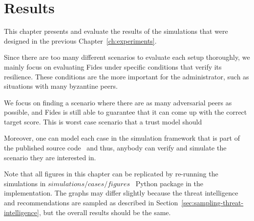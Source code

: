 \chapter{Results}
\label{ch:results}

This chapter presents and evaluate the results of the simulations that were designed in the previous Chapter~\ref{ch:experiments}. 

Since there are too many different scenarios to evaluate each setup thoroughly, we mainly focus on evaluating Fides under specific conditions that verify its resilience. These conditions are the more important for the administrator, such as situations with many byzantine peers.

We focus on finding a scenario where there are as many adversarial peers as possible, and Fides is still able to guarantee that it can come up with the correct target score. This is worst case scenario that a trust model should 


Moreover, one can model each case in the simulation framework that is part of the published source code~\cite{fidesGithub} and thus, anybody can verify and simulate the scenario they are interested in.



Note that all figures in this chapter can be replicated by re-running the simulations in $simulations/cases/figures$~\cite{fidesGithub} Python package in the implementation.
The graphs may differ slightly because the threat intelligence and recommendations are sampled as described in Section~\ref{sec:sampling-threat-intelligence}, but the overall results should be the same.





